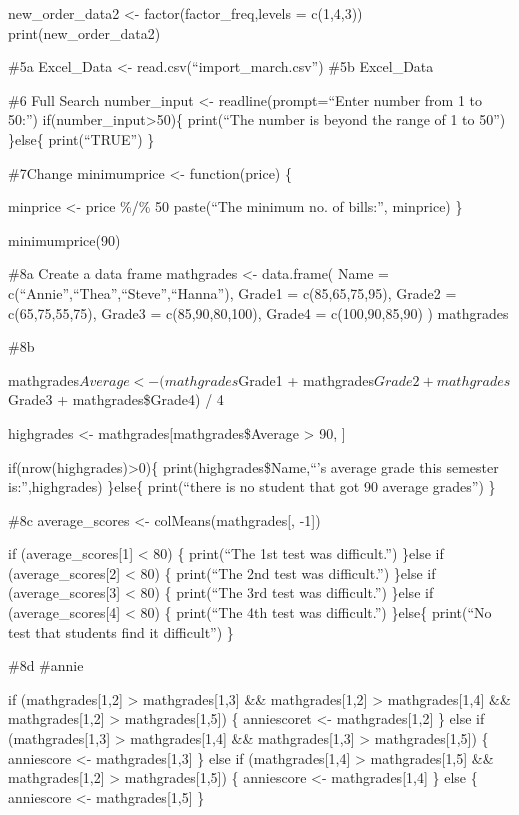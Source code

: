 \documentclass[
]{article}
\begin{document}
new\_order\_data2 \textless- factor(factor\_freq,levels = c(1,4,3))
print(new\_order\_data2)

\#5a Excel\_Data \textless- read.csv(``import\_march.csv'') \#5b
Excel\_Data

\#6 Full Search number\_input \textless- readline(prompt=``Enter number
from 1 to 50:'') if(number\_input\textgreater50)\{ print(``The number is
beyond the range of 1 to 50'') \}else\{ print(``TRUE'') \}

\#7Change minimumprice \textless- function(price) \{

minprice \textless- price \%/\% 50 paste(``The minimum no. of bills:'',
minprice) \}

minimumprice(90)

\#8a Create a data frame mathgrades \textless- data.frame( Name =
c(``Annie'',``Thea'',``Steve'',``Hanna''), Grade1 = c(85,65,75,95),
Grade2 = c(65,75,55,75), Grade3 = c(85,90,80,100), Grade4 =
c(100,90,85,90) ) mathgrades

\#8b

mathgrades\(Average <- (mathgrades\)Grade1 +
mathgrades\(Grade2 + mathgrades\)Grade3 + mathgrades\$Grade4) / 4

highgrades \textless- mathgrades{[}mathgrades\$Average \textgreater{}
90, {]}

if(nrow(highgrades)\textgreater0)\{ print(highgrades\$Name,``'s average
grade this semester is:'',highgrades) \}else\{ print(``there is no
student that got 90 average grades'') \}

\#8c average\_scores \textless- colMeans(mathgrades{[}, -1{]})

if (average\_scores{[}1{]} \textless{} 80) \{ print(``The 1st test was
difficult.\n'') \}else if (average\_scores{[}2{]} \textless{} 80) \{
print(``The 2nd test was difficult.\n'') \}else if
(average\_scores{[}3{]} \textless{} 80) \{ print(``The 3rd test was
difficult.\n'') \}else if (average\_scores{[}4{]} \textless{} 80) \{
print(``The 4th test was difficult.\n'') \}else\{ print(``No test that
students find it difficult'') \}

\#8d \#annie

if (mathgrades{[}1,2{]} \textgreater{} mathgrades{[}1,3{]} \&\&
mathgrades{[}1,2{]} \textgreater{} mathgrades{[}1,4{]} \&\&
mathgrades{[}1,2{]} \textgreater{} mathgrades{[}1,5{]}) \{ anniescoret
\textless- mathgrades{[}1,2{]} \} else if (mathgrades{[}1,3{]}
\textgreater{} mathgrades{[}1,4{]} \&\& mathgrades{[}1,3{]}
\textgreater{} mathgrades{[}1,5{]}) \{ anniescore \textless-
mathgrades{[}1,3{]} \} else if (mathgrades{[}1,4{]} \textgreater{}
mathgrades{[}1,5{]} \&\& mathgrades{[}1,2{]} \textgreater{}
mathgrades{[}1,5{]}) \{ anniescore \textless- mathgrades{[}1,4{]} \}
else \{ anniescore \textless- mathgrades{[}1,5{]} \}
\end{document}
